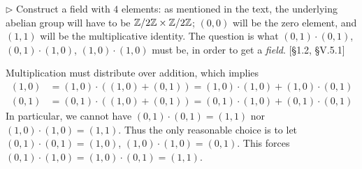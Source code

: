 \begin{problem}
	$\triangleright$ Construct a field with $4$ elements: as mentioned in the text, the underlying abelian group will have to be $\mathbb{Z}/2\mathbb{Z} \times \mathbb{Z}/2\mathbb{Z}$; $(0, 0)$ will be the zero element, and $(1, 1)$ will be the multiplicative identity. The question is what $(0, 1) \cdot (0, 1)$, $(0, 1) \cdot (1, 0)$, $(1, 0) \cdot (1, 0)$ must be, in order to get a \emph{field}. [\S 1.2, \S V.5.1]
\end{problem}

\begin{solution}
	Multiplication must distribute over addition, which implies
	\begin{align*}
		(1, 0) &= (1, 0) \cdot ((1, 0) + (0, 1)) = (1, 0) \cdot (1, 0) + (1, 0) \cdot (0, 1) \\
		(0, 1) &= (0, 1) \cdot ((1, 0) + (0, 1)) = (0, 1) \cdot(1, 0) + (0, 1) \cdot (0, 1)
	\end{align*}
	In particular, we cannot have $(0, 1) \cdot (0, 1) = (1, 1)$ nor $(1, 0) \cdot (1, 0) = (1, 1)$. Thus the only reasonable choice is to let $(0, 1) \cdot (0, 1) = (1, 0)$, $(1, 0) \cdot (1, 0) = (0, 1)$. This forces $(0, 1) \cdot (1, 0) = (1, 0) \cdot (0, 1) = (1, 1)$.
\end{solution}

